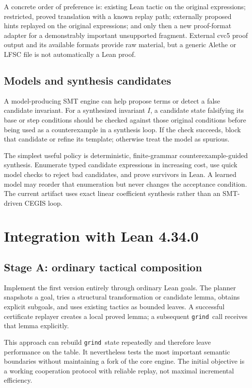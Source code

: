 \documentclass[11pt,a4paper]{article}
\newcommand{\grind}{\texttt{grind}}
\begin{document}
A concrete order of preference is: existing Lean tactic on the original expressions; restricted, proved translation with a known replay path; externally proposed hints replayed on the original expressions; and only then a new proof-format adapter for a demonstrably important unsupported fragment. External cvc5 proof output and its available formats provide raw material, but a generic Alethe or LFSC file is not automatically a Lean proof.\cite{cvc5-proofs}

\subsection{Models and synthesis candidates}

A model-producing SMT engine can help propose terms or detect a false candidate invariant. For a synthesized invariant $I$, a candidate state falsifying its base or step conditions should be checked against those original conditions before being used as a counterexample in a synthesis loop. If the check succeeds, block that candidate or refine its template; otherwise treat the model as spurious.

The simplest useful policy is deterministic, finite-grammar counterexample-guided synthesis. Enumerate typed candidate expressions in increasing cost, use quick model checks to reject bad candidates, and prove survivors in Lean. A learned model may reorder that enumeration but never changes the acceptance condition. The current artifact uses exact linear coefficient synthesis rather than an SMT-driven CEGIS loop.

\section{Integration with Lean 4.34.0}
\label{sec:integration}

\subsection{Stage A: ordinary tactical composition}

Implement the first version entirely through ordinary Lean goals. The planner snapshots a goal, tries a structural transformation or candidate lemma, obtains explicit subgoals, and uses existing tactics as bounded leaves. A successful certificate replayer creates a local proved lemma; a subsequent \grind\ call receives that lemma explicitly.

This approach can rebuild \grind\ state repeatedly and therefore leave performance on the table. It nevertheless tests the most important semantic boundaries without maintaining a fork of the core engine. The initial objective is a working cooperation protocol with reliable replay, not maximal incremental efficiency.
\end{document}
